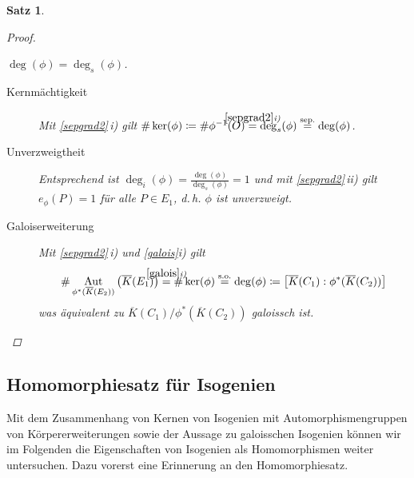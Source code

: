 \documentclass[english, german, parskip=half]{scrartcl}
\newtheorem{Satz}{Satz}[section]
\theoremstyle{definition}
\theoremstyle{remark}
\newcommand*{\algK}{\ensuremath{\overline K}} %
\newcommand*{\degs}{\operatorname{\deg}_s} %
\newcommand*{\degi}{\operatorname{\deg}_i} %
\renewcommand{\O}{O}
\DeclareMathOperator{\Aut}{Aut} %
\begin{document}
\begin{Satz}
\begin{proof}
\begin{enumerate}[label=\roman*)]
      $\deg(\phi)=\degs(\phi)$.
      \begin{description}
      \item[Kernmächtigkeit]
        Mit \autoref{sepgrad2}\,\emph{i)} gilt
        $
        \#\ker(\phi)
        \coloneqq \#\phi^{-1}(\O)
        \overset{\mathclap{\autoref{sepgrad2}\emph{i)}}}{=} \degs(\phi)
        \overset{{\text{sep.}}}{=} \deg(\phi)
        $.
      \item[Unverzweigtheit] 
        Entsprechend ist
        $\degi(\phi)=\frac{\deg(\phi)}{\degs(\phi)}=1$
        und mit \autoref{sepgrad2}\,\emph{ii)} gilt
        $e_\phi(P)=1$ für alle $P\in E_1$, d.\,h. $\phi$
        ist unverzweigt.
      \item[Galoiserweiterung]
        Mit \autoref{sepgrad2}\,\emph{i)} und \autoref{galois}\emph{i)} gilt
        \begin{align*}
          \#\Aut_{\phi^*(\algK(E_2))}\left( \algK(E_1) \right) 
          \overset{\mathclap{\autoref{galois}\emph{i)}}}{=}
          \#\ker(\phi)
          \overset{{\text{s.o.}}}{=} \deg(\phi)
          \coloneqq \left[\algK(C_1):\phi^*(\algK(C_2))\right]
        \end{align*}
        was äquivalent zu
        $\algK(C_1)/\phi^*(\algK(C_2))$ galoissch ist.
      \end{description}
    \end{enumerate}
  \end{proof}
\end{Satz}

\subsection[Homomorphiesatz]{Homomorphiesatz für Isogenien}
Mit dem Zusammenhang von Kernen von Isogenien mit
Automorphismengruppen von Körpererweiterungen sowie der Aussage zu
galoisschen Isogenien können wir im Folgenden die Eigenschaften von
Isogenien als Homomorphismen weiter untersuchen.
Dazu vorerst eine Erinnerung an den Homomorphiesatz.
\end{document}
